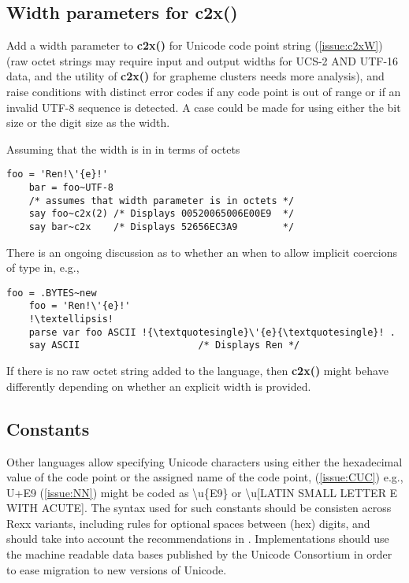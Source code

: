 \documentclass[b4paper]{article}
\begin{document}
\subsection{Width parameters for c2x()}

Add a width parameter to \textbf{c2x()} for Unicode code point string
(\cref{issue:c2xW})
(raw octet strings may require input and output widths for UCS-2 AND UTF-16 data, and the
utility of \textbf{c2x()} for grapheme clusters needs more
analysis), and raise conditions with distinct error codes if any code
point is out of range or if an invalid UTF-8 sequence is detected.  A
case could be made for using either the bit size or the digit size as
the width.

Assuming that the width is in in terms of octets
\begin{lstlisting}[linewidth=35em]
    foo = 'Ren!\'{e}!'
    bar = foo~UTF-8
    /* assumes that width parameter is in octets */
    say foo~c2x(2) /* Displays 00520065006E00E9  */
    say bar~c2x    /* Displays 52656EC3A9        */
\end{lstlisting}

There is an ongoing discussion as to whether an when to allow implicit coercions of type in, e.g.,
\begin{lstlisting}[linewidth=35em]
    foo = .BYTES~new
    foo = 'Ren!\'{e}!'
    !\textellipsis!
    parse var foo ASCII !{\textquotesingle}\'{e}{\textquotesingle}! .
    say ASCII                     /* Displays Ren */
\end{lstlisting}

If there is no raw octet string added to the language,
then \textbf{c2x()} might behave differently depending on whether an explicit width is provided.

\subsection{Constants}
Other languages allow specifying Unicode characters using either
the hexadecimal value of the code point or the assigned name of the code point,
(\cref{issue:CUC})
e.g., U+E9
(\cref{issue:NN})
might be coded as {\textbackslash}u\{E9\} or {\textbackslash}u[LATIN SMALL LETTER E WITH ACUTE].
The syntax used for such constants should be consisten across Rexx variants,
including rules for optional spaces between (hex) digits,
and should take into account the recommendations in \cite{RFC 5137}.
Implementations should use the machine readable data bases published by
the Unicode Consortium in order to ease migration to new versions of Unicode.
\end{document}
